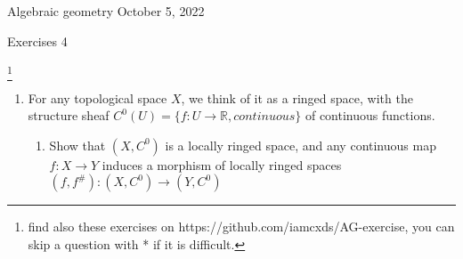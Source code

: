\documentclass[a4paper,11pt]{article}
\def\bb#1{\mathbb{#1}}
\begin{document}
{\small Algebraic geometry \hfill October 5, 2022 \\}
\begin{center}
\Huge Exercises 4
\end{center}

\vskip0.6cm
\footnote{find also these exercises on https://github.com/iamcxds/AG-exercise, you can skip a question with * if it is difficult.}

\begin{enumerate}[1.]

\item For any topological space $ X $, we think of it as a ringed space, with the structure sheaf $C^0(U)=\{f: U\to \bb{R},continuous \}$ of continuous functions.
\begin{enumerate}
    \item Show that $(X, C^0)$ is a locally ringed space, and any continuous map $f: X\to Y$ induces a morphism of locally ringed spaces $ (f,f^\#) : (X,C^0)\to (Y,C^0) $
    

\end{enumerate}
\end{enumerate}
\end{document}

